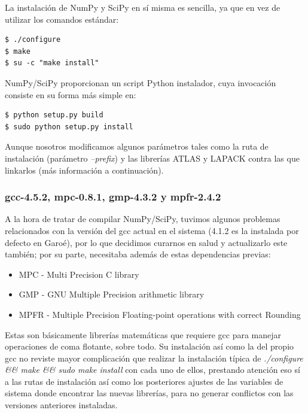 \documentclass[twoside]{article}
\begin{document}
\vspace{5 mm}

La instalación de NumPy y SciPy en sí misma es sencilla, ya que en vez de utilizar los comandos estándar:

\begin{verbatim}
$ ./configure
$ make
$ su -c "make install"
\end{verbatim}

NumPy/SciPy proporcionan un script Python instalador, cuya invocación consiste en su forma más simple en:

\begin{verbatim}
$ python setup.py build
$ sudo python setup.py install
\end{verbatim}

Aunque nosotros modificamos algunos parámetros tales como la ruta de instalación (parámetro \emph{--prefix}) y las librerías ATLAS y LAPACK contra las que linkarlos (más información a continuación).

\subsubsection{gcc-4.5.2, mpc-0.8.1, gmp-4.3.2 y mpfr-2.4.2}

A la hora de tratar de compilar NumPy/SciPy, tuvimos algunos problemas relacionados con la versión del gcc actual en el sistema (4.1.2 es la instalada por defecto en Garoé), por lo que decidimos curarnos en salud y actualizarlo este también; por su parte, necesitaba además de estas dependencias previas:

\begin{itemize}
   \item MPC - Multi Precision C library
   \item GMP - GNU Multiple Precision arithmetic library
   \item MPFR - Multiple Precision Floating-point operations with correct Rounding
\end{itemize}

Estas son básicamente librerías matemáticas que requiere gcc para manejar operaciones de coma flotante, sobre todo. Su instalación así como la del propio gcc no reviste mayor complicación que realizar la instalación típica de \emph{./configure \&\& make \&\& sudo make install} con cada uno de ellos, prestando atención eso sí a las rutas de instalación así como los posteriores ajustes de las variables de sistema donde encontrar las nuevas librerías, para no generar conflictos con las versiones anteriores instaladas.
\end{document}

